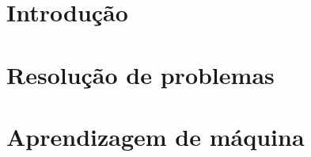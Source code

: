 \newcommand{\templatesdir}{../../templates}
\newcommand{\template}{template-notas-aula-ia}


\newcommand{\myname}{Prof. Marcelo de Souza}
\newcommand{\university}{Universidade do Estado de Santa Catarina}
\newcommand{\campus}{Centro de Educação Superior do Alto Vale do Itajaí}
\newcommand{\mytitle}{Inteligência Computacional\\Notas de Aula}
\newcommand{\version}{Versão compilada em \today.}
\newcommand{\exercisedescription}{Exercício}

\newcommand{\presentation}{Este material é utilizado nas aulas da disciplina de Inteligência Computacional (75INC) do curso de Bacharelado em Engenharia de Software da Universidade do Estado de Santa Catarina (UDESC Ibirama). Cada capítulo apresenta no seu cabeçalho uma ou mais leituras obrigatórias, que consistem nos materiais que serviram de base para o desenvolvimento do capítulo. \\ \\
\textbf{Contato:} \texttt{marcelo.desouza@udesc.br}}

\newcommand{\license}{\small Esta obra está disponível sob uma Licença \href{https://creativecommons.org/licenses/by-nc-nd/4.0}{Creative Commons (BY-NC-ND 4.0 Internacional)}.}

\newcommand{\logo}{
\begin{figure}[h]
	\centering
	\texttt{[image: \\templatesdir/\\template/img/logo-udesc.png]}
\end{figure}
}



\maketitle
\tableofcontents

\part{Introdução}



\part{Resolução de problemas}


 
\part{Aprendizagem de máquina}





